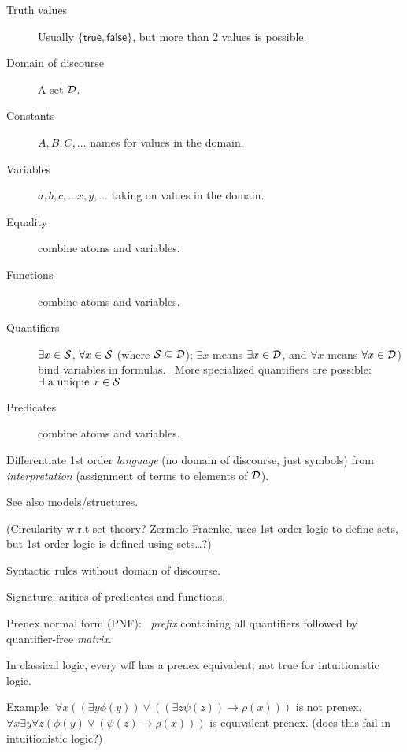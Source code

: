 \begin{description}
\item[Truth values] Usually $\{\mathsf{true},\mathsf{false}\}$,
but more than $2$ values is possible.
\item[Domain of discourse] A set $\mathcal{D}$.
\item[Constants] $A,B,C, \ldots$ names for values in the
domain.
\item[Variables] $a,b,c, \ldots x,y,\dots$ taking on values in the
domain.~\cite{wiki:Free_variables_and_bound_variables}
\item[Equality] combine atoms and variables.
\item[Functions] combine atoms and variables.
\item[Quantifiers]   
$\exists x \in \mathcal{S}$, $\forall x \in \mathcal{S}$ 
(where $\mathcal{S} \subseteq \mathcal{D}$);
$\exists x$ means $\exists x \in \mathcal{D}$, 
and
$\forall x$ means $\forall x \in \mathcal{D}$) 
bind variables in
formulas.~\cite{wiki:Quantifier_logic}
More specialized quantifiers are possible:
$\exists \textrm{ a unique } x \in \mathcal{S}$
\item[Predicates] combine atoms and variables.
\end{description} 

Differentiate 1st order \textit{language} 
(no domain of discourse, just symbols)
from \textit{interpretation} 
(assignment of terms to elements of $\mathcal{D}$).

See also models/structures.~\cite{wiki:Model_theory}

(Circularity w.r.t set theory?
Zermelo-Fraenkel uses 1st order logic to define sets,
but 1st order logic is defined using sets\ldots?)


\label{sec:First_order_language}

Syntactic rules without domain of discourse.

Signature: arities of predicates and functions.

Prenex normal form (PNF):~\cite{wiki:Prenex_normal_form} 
\textit{prefix} containing all quantifiers 
followed by quantifier-free \textit{matrix}.

In classical logic, every wff has a prenex equivalent;
not true for intuitionistic logic.

Example:
$\forall x 
((\exists y\phi (y))
\lor 
((\exists z\psi (z))\rightarrow \rho (x)))$ is not prenex.
$\forall x\exists y\forall z
(\phi (y)\lor (\psi (z)\rightarrow \rho (x)))$ 
is equivalent prenex. 
(does this fail in intuitionistic logic?)



